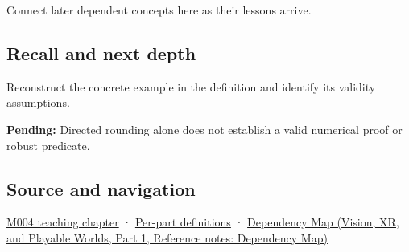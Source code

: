 \hypertarget{appendix-1823a14330cb-used-by}{}

Connect later dependent concepts here as their lessons arrive.

\subsection{Recall and next depth}\label{appendix-1823a14330cb-recall-and-next-depth}

\hypertarget{appendix-1823a14330cb-recall-and-next-depth}{}

Reconstruct the concrete example in the definition and identify its validity assumptions.

\textbf{Pending:} Directed rounding alone does not establish a valid numerical proof or robust predicate.

\subsection{Source and navigation}\label{appendix-1823a14330cb-source-and-navigation}

\hypertarget{appendix-1823a14330cb-source-and-navigation}{}

\hyperref[01-foundations-i-ch001-a-stretching-ruler-for-real-valued-quantities]{M004 teaching chapter} · \hyperref[appendix-fd090d982a15-m004---parts-61-76]{Per-part definitions} · \href{../07-Vision-XR-and-Playable-Worlds-P01/main.pdf\#nameddest=appendix-4ad47bdd269a}{Dependency Map (Vision, XR, and Playable Worlds, Part 1, Reference notes: Dependency Map)}

